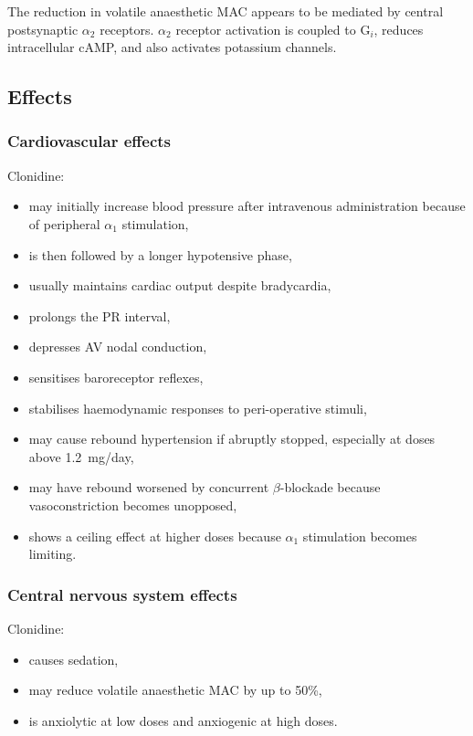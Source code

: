\documentclass[11pt,a4paper]{article}
\begin{document}
The reduction in volatile anaesthetic MAC appears to be mediated by central postsynaptic $\alpha_2$ receptors. $\alpha_2$ receptor activation is coupled to G$_i$, reduces intracellular cAMP, and also activates potassium channels.

\subsection{Effects}

\subsubsection{Cardiovascular effects}

Clonidine:
\begin{itemize}
    \item may initially increase blood pressure after intravenous administration because of peripheral $\alpha_1$ stimulation,
    \item is then followed by a longer hypotensive phase,
    \item usually maintains cardiac output despite bradycardia,
    \item prolongs the PR interval,
    \item depresses AV nodal conduction,
    \item sensitises baroreceptor reflexes,
    \item stabilises haemodynamic responses to peri-operative stimuli,
    \item may cause rebound hypertension if abruptly stopped, especially at doses above 1.2~mg/day,
    \item may have rebound worsened by concurrent $\beta$-blockade because vasoconstriction becomes unopposed,
    \item shows a ceiling effect at higher doses because $\alpha_1$ stimulation becomes limiting.
\end{itemize}

\subsubsection{Central nervous system effects}

Clonidine:
\begin{itemize}
    \item causes sedation,
    \item may reduce volatile anaesthetic MAC by up to 50\%,
    \item is anxiolytic at low doses and anxiogenic at high doses.
\end{itemize}
\end{document}
